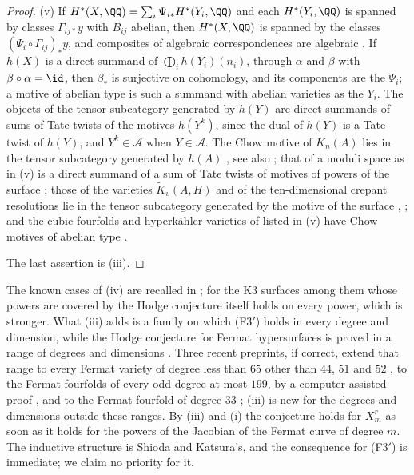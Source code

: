 \begin{proof}
(v) If $H^{*}(X,\QQ)=\sum_{i}\Psi_{i*}H^{*}(Y_{i},\QQ)$ and each
$H^{*}(Y_{i},\QQ)$ is spanned by classes $\Gamma_{ij*}y$ with $B_{ij}$
abelian, then $H^{*}(X,\QQ)$ is spanned by the classes
$(\Psi_{i}\circ\Gamma_{ij})_{*}y$, and composites of algebraic
correspondences are algebraic \cite[Chapter~16]{Ful98}. If $h(X)$ is a
direct summand of $\bigoplus_{i}h(Y_{i})(n_{i})$, through $\alpha$ and
$\beta$ with $\beta\circ\alpha=\id$, then $\beta_{*}$ is surjective on
cohomology, and its components are the $\Psi_{i}$; a motive of abelian type
is such a summand with abelian varieties as the $Y_{i}$. The objects of the
tensor subcategory generated by $h(Y)$ are direct summands of sums of Tate
twists of the motives $h(Y^{k})$, since the dual of $h(Y)$ is a Tate twist of
$h(Y)$, and $Y^{k}\in\mathcal{A}$ when $Y\in\mathcal{A}$. The Chow motive of
$K_{n}(A)$ lies in the tensor subcategory generated by $h(A)$
\cite[Theorem~2.7, Corollary~2.8]{Xu15}, see also \cite[Theorem~1.5]{FTV19};
that of a moduli space as in (v) is a direct summand of a sum of Tate twists
of motives of powers of the surface \cite[Theorem~0.1]{Bue20}; those of the
varieties $\widetilde K_{v}(A,H)$ and of the ten-dimensional crepant
resolutions lie in the tensor subcategory generated by the motive of the
surface \cite[Theorem~1.1]{Flo23}, \cite[Corollary~4.5]{FFZ21}; and the cubic
fourfolds and hyperk\"ahler varieties of \cite{ABLP26} listed in (v) have
Chow motives of abelian type \cite[Theorem~3.5 and its proof,
Proposition~3.9, Theorem~4.2]{ABLP26}.

The last assertion is (iii).
\end{proof}

The known cases of (iv) are recalled in ; for the K3
surfaces among them whose powers are covered by \cite{Var22} the Hodge
conjecture itself holds on every power, which is stronger. What (iii) adds is
a family on which \textup{(F3$'$)} holds in every degree and dimension, while
the Hodge conjecture for Fermat hypersurfaces is proved in a range of degrees
and dimensions \cite{Shi79b}. Three recent preprints, if
correct, extend that range to every Fermat variety of degree less than $65$
other than $44$, $51$ and $52$ \cite{MMMV26}, to the Fermat fourfolds of
every odd degree at most $199$, by a computer-assisted proof \cite{Jum26},
and to the Fermat fourfold of degree $33$ \cite{FK26}; (iii) is new for the
degrees and dimensions outside these ranges. By (iii) and
(i) the conjecture holds for $X^{r}_{m}$ as soon as it
holds for the powers of the Jacobian of the Fermat curve of degree $m$. The
inductive structure is Shioda and Katsura's, and the consequence for
\textup{(F3$'$)} is immediate; we claim no priority for it.


